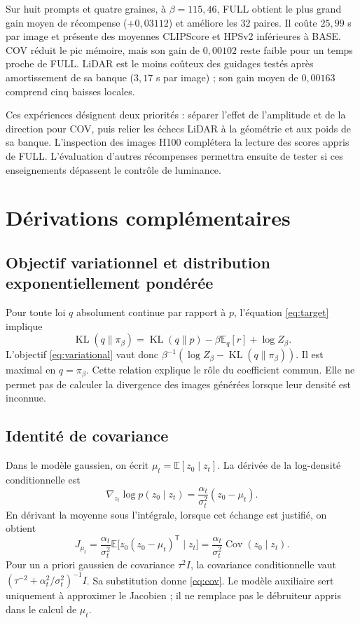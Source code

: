 \documentclass[11pt,a4paper]{article}
\newcommand{\E}{\mathbb{E}}
\newcommand{\Cov}{\operatorname{Cov}}
\newcommand{\KL}{\operatorname{KL}}
\begin{document}
Sur huit prompts et quatre graines, à $\beta=115{,}46$, FULL obtient le plus grand gain moyen de récompense ($+0{,}03112$) et améliore les 32 paires. Il coûte $25{,}99$ s par image et présente des moyennes CLIPScore et HPSv2 inférieures à BASE. COV réduit le pic mémoire, mais son gain de $0{,}00102$ reste faible pour un temps proche de FULL. LiDAR est le moins coûteux des guidages testés après amortissement de sa banque ($3{,}17$ s par image) ; son gain moyen de $0{,}00163$ comprend cinq baisses locales.

Ces expériences désignent deux priorités : séparer l'effet de l'amplitude et de la direction pour COV, puis relier les échecs LiDAR à la géométrie et aux poids de sa banque. L'inspection des images H100 complétera la lecture des scores appris de FULL. L'évaluation d'autres récompenses permettra ensuite de tester si ces enseignements dépassent le contrôle de luminance.

\clearpage
\appendix
\section{Dérivations complémentaires}
\subsection{Objectif variationnel et distribution exponentiellement pondérée}
Pour toute loi $q$ absolument continue par rapport à $p$, l'équation \eqref{eq:target} implique
\begin{equation}
\KL(q\|\pi_\beta)=\KL(q\|p)-\beta\E_q[r]+\log Z_\beta.
\end{equation}
L'objectif \eqref{eq:variational} vaut donc $\beta^{-1}(\log Z_\beta-\KL(q\|\pi_\beta))$. Il est maximal en $q=\pi_\beta$. Cette relation explique le rôle du coefficient commun. Elle ne permet pas de calculer la divergence des images générées lorsque leur densité est inconnue.

\subsection{Identité de covariance}
Dans le modèle gaussien, on écrit $\mu_t=\E[z_0\mid z_t]$. La dérivée de la log-densité conditionnelle est
\begin{equation}
\nabla_{z_t}\log p(z_0\mid z_t)
=\frac{\alpha_t}{\sigma_t^2}(z_0-\mu_t).
\end{equation}
En dérivant la moyenne sous l'intégrale, lorsque cet échange est justifié, on obtient
\begin{equation}
J_{\mu_t}=\frac{\alpha_t}{\sigma_t^2}
\E\bigl[z_0(z_0-\mu_t)^{\mathsf T}\mid z_t\bigr]
=\frac{\alpha_t}{\sigma_t^2}\Cov(z_0\mid z_t).
\end{equation}
Pour un a priori gaussien de covariance $\tau^2I$, la covariance conditionnelle vaut
$(\tau^{-2}+\alpha_t^2/\sigma_t^2)^{-1}I$. Sa substitution donne \eqref{eq:cov}. Le modèle auxiliaire sert uniquement à approximer le Jacobien ; il ne remplace pas le débruiteur appris dans le calcul de $\mu_t$.
\end{document}
